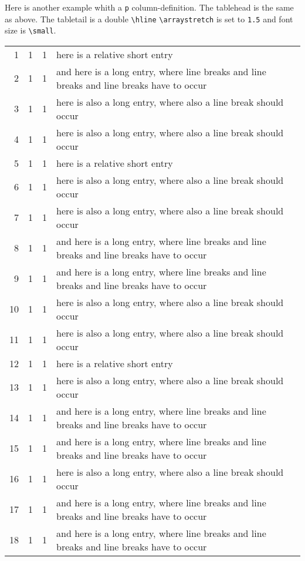 Here is another example whith a {\tt p} column-definition. The tablehead
is the same as above. The tabletail is a double \verb|\hline|
\verb|\arraystretch| is set to {\tt 1.5} and font size is \verb|\small|.
\begin{center}
\tablelasttail{\hline\hline}
\renewcommand{\arraystretch}{1.5}
\small
\begin{supertabular}{| r@{\hspace{6.5mm}}| r@{\hspace{5.5mm}}| r p{5cm}|}
1  &  1  &  1  &  here is a relative short entry \\
2  &  1  &  1  &  and here is a long entry, where line breaks and line
                  breaks and line breaks have to occur \\
3  &  1  &  1  &  here is also a long entry, where also a line break
                  should occur\\
4  &  1  &  1  &  here is also a long entry, where also a line break
                  should occur\\
5  &  1  &  1  &  here is a relative short entry \\
6  &  1  &  1  &  here is also a long entry, where also a line break
                  should occur\\
7  &  1  &  1  &  here is also a long entry, where also a line break
                  should occur\\
8  &  1  &  1  &  and here is a long entry, where line breaks and line
                  breaks and line breaks have to occur \\
9  &  1  &  1  &  and here is a long entry, where line breaks and line
                  breaks and line breaks have to occur \\
10 &  1  &  1  &  here is also a long entry, where also a line break
                  should occur\\
11 &  1  &  1  &  here is also a long entry, where also a line break
                  should occur\\
12 &  1  &  1  &  here is a relative short entry \\
13 &  1  &  1  &  here is also a long entry, where also a line break
                  should occur\\
14 &  1  &  1  &  and here is a long entry, where line breaks and line
                  breaks and line breaks have to occur \\
15 &  1  &  1  &  and here is a long entry, where line breaks and line
                  breaks and line breaks have to occur \\
16 &  1  &  1  &  here is also a long entry, where also a line break
                  should occur\\
17 &  1  &  1  &  and here is a long entry, where line breaks and line
                  breaks and line breaks have to occur \\
18 &  1  &  1  &  and here is a long entry, where line breaks and line
                  breaks and line breaks have to occur \\
\end{supertabular}
\end{center}
 

